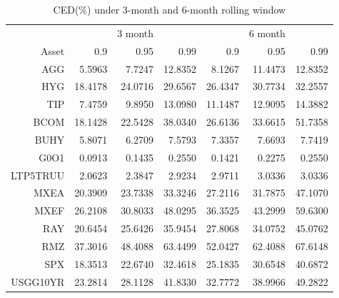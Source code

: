 \documentclass[12pt]{article}
\begin{document}
\begin{table}[!h]
\caption{CED(\%) under 3-month and 6-month rolling window} %
\centering 
\begin{tabular}{ | r || r r r || r r r |} 
 \hline
 & & 3 month & & & 6 month & \\
Asset& 0.9 & 0.95 & 0.99 & 0.9 & 0.95 & 0.99  \\
  \hline \hline
AGG &  5.5963 &  7.7247 & 12.8352 &  8.1267 & 11.4473 & 12.8352\\ 
HYG & 18.4178 & 24.0716 & 29.6567 & 26.4347 & 30.7734 & 32.2557\\ 
TIP &  7.4759 &  9.8950 & 13.0980 & 11.1487 & 12.9095 & 14.3882\\ 
BCOM & 18.1428 & 22.5428 & 38.0340 & 26.6136 & 33.6615 & 51.7358\\ 
BUHY &  5.8071 &  6.2709 &  7.5793 &  7.3357 &  7.6693 &  7.7419\\ 
G0O1 &  0.0913 &  0.1435 &  0.2550 &  0.1421 &  0.2275 &  0.2550\\ 
LTP5TRUU &  2.0623 &  2.3847 &  2.9234 &  2.9711 &  3.0336 &  3.0336\\ 
MXEA & 20.3909 & 23.7338 & 33.3246 & 27.2116 & 31.7875 & 47.1070\\ 
MXEF & 26.2108 & 30.8033 & 48.0295 & 36.3525 & 43.2999 & 59.6300\\ 
RAY & 20.6454 & 25.6426 & 35.9454 & 27.8068 & 34.0752 & 45.0762\\ 
RMZ & 37.3016 & 48.4088 & 63.4499 & 52.0427 & 62.4088 & 67.6148\\ 
SPX & 18.3513 & 22.6740 & 32.4618 & 25.1835 & 30.6548 & 40.6872\\ 
USGG10YR & 23.2814 & 28.1128 & 41.8330 & 32.7772 & 38.9966 & 49.2822\\
 \hline
\end{tabular}
\label{table:CED3}
\end{table}
\end{document}
